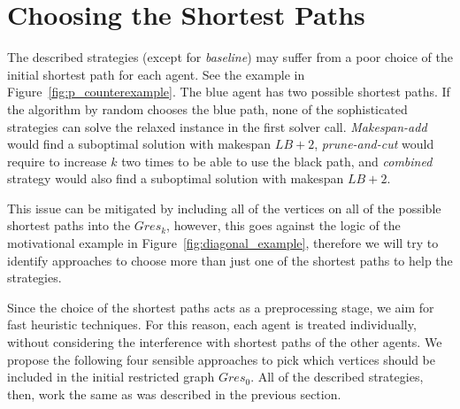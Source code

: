 \section{Choosing the Shortest Paths}
\label{sec:SP}

The described strategies (except for \emph{baseline}) may suffer from a poor choice of the initial shortest path for each agent. See the example in Figure~\ref{fig:p_counterexample}. The blue agent has two possible shortest paths. If the algorithm by random chooses the blue path, none of the sophisticated strategies can solve the relaxed instance in the first solver call. \emph{Makespan-add} would find a suboptimal solution with makespan $LB+2$, \emph{prune-and-cut} would require to increase $k$ two times to be able to use the black path, and \emph{combined} strategy would also find a suboptimal solution with makespan $LB+2$.

This issue can be mitigated by including all of the vertices on all of the possible shortest paths into the $Gres_{k}$, however, this goes against the logic of the motivational example in Figure~\ref{fig:diagonal_example}, therefore we will try to identify approaches to choose more than just one of the shortest paths to help the strategies.

Since the choice of the shortest paths acts as a preprocessing stage, we aim for fast heuristic techniques. For this reason, each agent is treated individually, without considering the interference with shortest paths of the other agents. We propose the following four sensible approaches to pick which vertices should be included in the initial restricted graph $Gres_{0}$. All of the described strategies, then, work the same as was described in the previous section.

